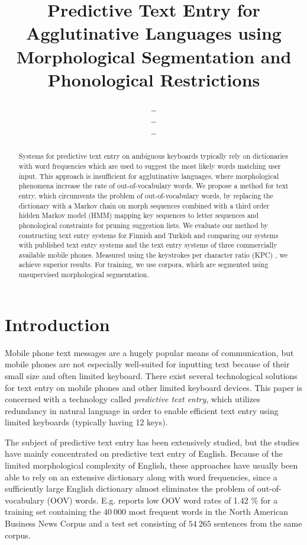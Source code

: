 \documentclass{llncs}
\begin{document}
\title{Predictive Text Entry for Agglutinative Languages using Morphological Segmentation and Phonological Restrictions}

\author{\ldots\\\ldots\\\ldots}
\institute{\ldots}

\maketitle

\begin{abstract}
Systems for predictive text entry on ambiguous keyboards typically
rely on dictionaries with word frequencies which are used to suggest
the most likely words matching user input. This approach is
insufficient for agglutinative languages, where morphological
phenomena increase the rate of out-of-vocabulary words. We propose a
method for text entry, which circumvents the problem of
out-of-vocabulary words, by replacing the dictionary with a Markov
chain on morph sequences combined with a third order hidden Markov
model (HMM) mapping key sequences to letter sequences and phonological
constraints for pruning suggestion lists. We evaluate our method by
constructing text entry systems for Finnish and Turkish and comparing
our systems with published text entry systems and the text entry systems
of three commercially available mobile phones. Measured using the
keystrokes per character ratio (KPC) \cite{MacKenzie02kspc}, we
achieve superior results. For training, we use corpora, which are
segmented using unsupervised morphological segmentation.
\end{abstract}

\section{Introduction}

Mobile phone text messages are a hugely popular means of
communication, but mobile phones are not especially well-suited for
inputting text because of their small size and often limited
keyboard. There exist several technological solutions for text entry
on mobile phones and other limited keyboard devices. This paper is
concerned with a technology called \textit{predictive text entry}, which
utilizes redundancy in natural language in order to enable efficient
text entry using limited keyboards (typically having 12 keys).

The subject of predictive text entry has been extensively studied, but
the studies have mainly concentrated on predictive text entry of
English. Because of the limited morphological complexity of English,
these approaches have usually been able to rely on an extensive
dictionary along with word frequencies, since a sufficiently large
English dictionary almost eliminates the problem of out-of-vocabulary
(OOV) words. E.g. \cite{klarlund/2002} reports low OOV word rates of
1.42 \% for a training set containing the $40\ 000$ most frequent words
in the North American Business News Corpus and a test set consisting
of $54\ 265$ sentences from the same corpus.
\end{document}
